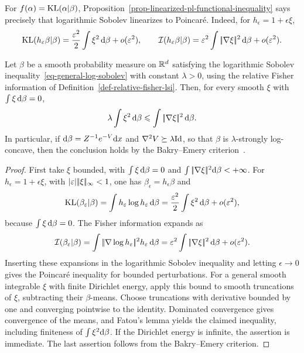 For \(f(\alpha)=\operatorname{KL}(\alpha|\beta)\), Proposition~\ref{prop-linearized-pl-functional-inequality} says precisely that logarithmic Sobolev linearizes to Poincar\'e. Indeed, for \(h_\epsilon=1+\epsilon\xi\),
\[
	\operatorname{KL}(h_\varepsilon\beta|\beta)
	=
	\frac{\varepsilon^2}{2}\int\xi^2\,\mathrm{d}\beta+o(\varepsilon^2),
	\qquad
	\mathcal I(h_\varepsilon\beta|\beta)
	=
	\varepsilon^2\int|\!| \nabla\xi |\!|^2\,\mathrm{d}\beta+o(\varepsilon^2).
\]

\begin{prop}\label{prop-poincare-linearized-wasserstein-pl}
	Let \(\beta\) be a smooth probability measure on \(\mathbb{R}^d\) satisfying the logarithmic Sobolev inequality~\eqref{eq-general-log-sobolev} with constant \(\lambda>0\), using the relative Fisher information of Definition~\ref{def-relative-fisher-lsi}.
	Then, for every smooth \(\xi\) with \(\int\xi\,\mathrm{d}\beta=0\),
	\[
		\lambda\int\xi^2\,\mathrm{d}\beta
		\leqslant
		\int|\!| \nabla\xi |\!|^2\,\mathrm{d}\beta.
	\]
	In particular, if \(\mathrm{d}\beta=Z^{-1}e^{-V}\mathrm{d} x\) and \(\nabla^2 V\succeq \lambda\mathrm{Id}\), so that \(\beta\) is \(\lambda\)-strongly log-concave, then the conclusion holds by the Bakry--Emery criterion~\cite{BakryEmery1985Diffusions,BakryGentilLedoux2014Markov}.
\end{prop}

\begin{proof}
	First take $\xi$ bounded, with $\int\xi\,\mathrm{d}\beta=0$ and $\int|\!| \nabla\xi |\!|^2\mathrm{d}\beta<+\infty$. For \(h_\epsilon=1+\epsilon\xi\), with \(|\varepsilon||\!| \xi |\!|_\infty<1\), one has \(\beta_\epsilon=h_\epsilon\beta\) and
	\[
		\operatorname{KL}(\beta_\varepsilon|\beta)
		=
		\int h_\varepsilon\log h_\varepsilon\,\mathrm{d}\beta
		=
		\frac{\varepsilon^2}{2}\int\xi^2\,\mathrm{d}\beta+o(\varepsilon^2),
	\]
	because \(\int\xi\,\mathrm{d}\beta=0\). The Fisher information expands as
	\[
		\mathcal I(\beta_\varepsilon|\beta)
		=
		\int|\!| \nabla\log h_\varepsilon |\!|^2 h_\varepsilon\,\mathrm{d}\beta
		=
		\varepsilon^2\int|\!| \nabla\xi |\!|^2\,\mathrm{d}\beta+o(\varepsilon^2).
	\]
	Inserting these expansions in the logarithmic Sobolev inequality and letting \(\epsilon\to0\) gives the Poincar\'e inequality for bounded perturbations. For a general smooth integrable $\xi$ with finite Dirichlet energy, apply this bound to smooth truncations of $\xi$, subtracting their $\beta$-means. Choose truncations with derivative bounded by one and converging pointwise to the identity. Dominated convergence gives convergence of the means, and Fatou's lemma yields the claimed inequality, including finiteness of $\int\xi^2\mathrm{d}\beta$. If the Dirichlet energy is infinite, the assertion is immediate. The last assertion follows from the Bakry--Emery criterion.
\end{proof}

